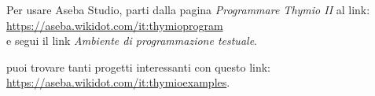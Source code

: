 Per usare Aseba Studio, parti dalla pagina \emph{Programmare Thymio II} al link:\\
\url{https://aseba.wikidot.com/it:thymioprogram}\\
e segui il link \emph{Ambiente di programmazione testuale}.

puoi trovare tanti progetti interessanti con questo link:\\ \url{https://aseba.wikidot.com/it:thymioexamples}.

\vspace{4em}


